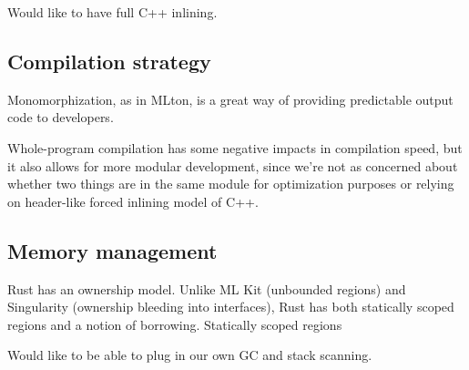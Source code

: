 Would like to have full C++ inlining.

\subsection{Compilation strategy}
Monomorphization, as in MLton, is a great way of providing predictable output code to developers.

Whole-program compilation has some negative impacts in compilation speed, but it also allows for more modular development, since we're not as concerned about whether two things are in the same module for optimization purposes or relying on header-like forced inlining model of C++.

\subsection{Memory management}
Rust has an ownership model.
Unlike ML Kit (unbounded regions) and Singularity (ownership bleeding into interfaces), Rust has both statically scoped regions and a notion of borrowing.
Statically scoped regions


Would like to be able to plug in our own GC and stack scanning.



